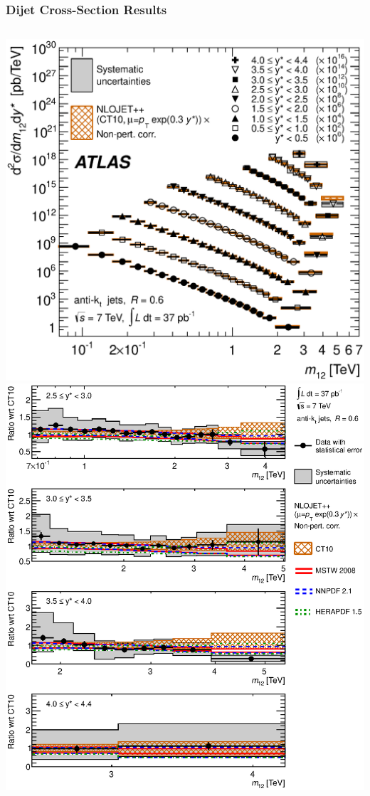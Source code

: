 \documentclass[10pt]{beamer}
\begin{document}
\begin{frame}\frametitle{Dijet Cross-Section Results}
\begin{columns}
\includegraphics[width=0.95\linewidth,angle=0]{inclusive_results/figs_new/fig_15.eps}
\includegraphics[width=0.95\linewidth,angle=0]{inclusive_results/figs_new/fig_17b.eps}%

\end{columns}
\end{frame}
\end{document}
